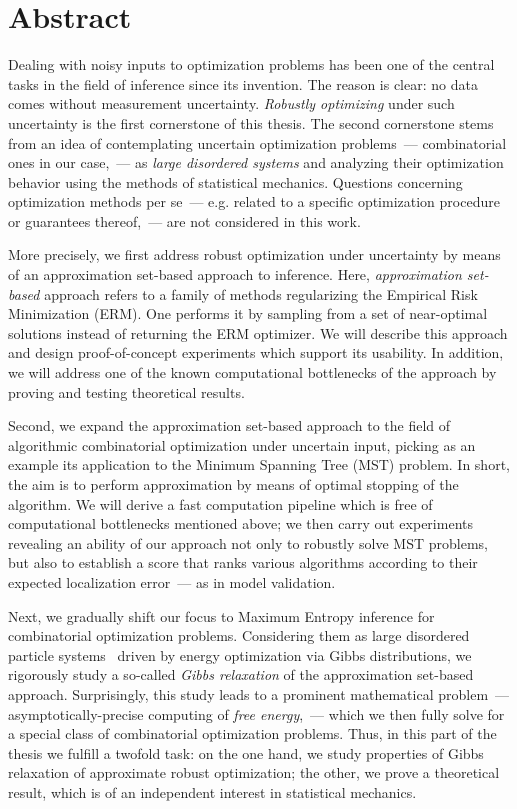 \chapter*{Abstract}

Dealing with noisy inputs to optimization problems has been one of the central
tasks in the field of inference since its invention. The reason is clear: no
data comes without measurement uncertainty.  \textit{Robustly optimizing} under
such uncertainty is the first cornerstone of this thesis. The second cornerstone
stems from an idea of contemplating uncertain optimization problems~---
combinatorial ones in our case,~--- as \textit{large disordered systems} and
analyzing their optimization behavior using the methods of statistical mechanics.
Questions concerning optimization methods per se~--- e.g. related to a specific
optimization procedure or guarantees thereof,~--- are not considered in this work.

More precisely, we first address robust optimization under uncertainty by means
of an approximation set-based approach to inference. Here, \textit{approximation
set-based} approach refers to a family of methods regularizing the Empirical
Risk Minimization (ERM). One performs it by sampling from a set of near-optimal
solutions instead of returning the ERM optimizer.  We will describe this
approach and design proof-of-concept experiments which support its usability. In
addition, we will address one of the known computational bottlenecks of the
approach by proving and testing theoretical results.

Second, we expand the approximation set-based approach to the field of
algorithmic combinatorial optimization under uncertain input, picking as an
example its application to the  Minimum Spanning Tree (MST) problem. In short,
the aim is to perform approximation by means of optimal stopping of the
algorithm. We will derive a fast computation pipeline which is free of
computational bottlenecks mentioned above; we then carry out experiments
revealing an ability of our approach not only to robustly solve MST problems,
but also to establish a score that ranks various algorithms according to their
expected localization error~--- as in model validation.

Next, we gradually shift our focus to Maximum Entropy inference for
combinatorial optimization problems. Considering them as large disordered
particle systems~\citep{book/MezardM09} driven by energy optimization via Gibbs
distributions, we rigorously study a so-called \textit{Gibbs relaxation} of the
approximation set-based approach. Surprisingly, this study leads to a prominent
mathematical problem~--- asymptotically-precise computing of \textit{free
energy},~--- which we then fully solve for a special class of combinatorial
optimization problems. Thus, in this part of the thesis we fulfill a twofold
task: on the one hand, we study properties of Gibbs relaxation of approximate
robust optimization; the other, we prove a theoretical result, which is of an
independent interest in statistical mechanics.

